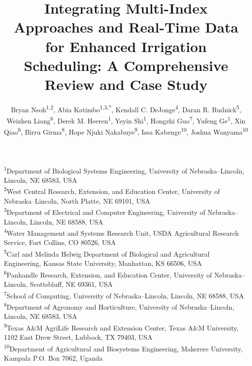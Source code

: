 \documentclass[12pt]{article}
\begin{document}
\title{Integrating Multi-Index Approaches and Real-Time Data for Enhanced Irrigation Scheduling: A Comprehensive Review and Case Study}
\author{%
Bryan Nsoh\textsuperscript{1,2},
Abia Katimbo\textsuperscript{1,3,*},
Kendall C. DeJonge\textsuperscript{4},
Daran R. Rudnick\textsuperscript{5},
Weizhen Liang\textsuperscript{6},
Derek M. Heeren\textsuperscript{1},
Yeyin Shi\textsuperscript{1},
Hongzhi Guo\textsuperscript{7},
Yufeng Ge\textsuperscript{1},
Xin Qiao\textsuperscript{6},
Birru Girma\textsuperscript{8},
Hope Njuki Nakabuye\textsuperscript{9},
Issa Kabenge\textsuperscript{10},
Joshua Wanyama\textsuperscript{10}
}
\date{\vspace{-1em}} %
\maketitle

\noindent
\textsuperscript{1}Department of Biological Systems Engineering, University of Nebraska--Lincoln, Lincoln, NE 68583, USA\\
\textsuperscript{2}West Central Research, Extension, and Education Center, University of Nebraska--Lincoln, North Platte, NE 69101, USA\\
\textsuperscript{3}Department of Electrical and Computer Engineering, University of Nebraska--Lincoln, Lincoln, NE 68588, USA\\
\textsuperscript{4}Water Management and Systems Research Unit, USDA Agricultural Research Service, Fort Collins, CO 80526, USA\\
\textsuperscript{5}Carl and Melinda Helwig Department of Biological and Agricultural Engineering, Kansas State University, Manhattan, KS 66506, USA\\
\textsuperscript{6}Panhandle Research, Extension, and Education Center, University of Nebraska--Lincoln, Scottsbluff, NE 69361, USA\\
\textsuperscript{7}School of Computing, University of Nebraska--Lincoln, Lincoln, NE 68588, USA\\
\textsuperscript{8}Department of Agronomy and Horticulture, University of Nebraska--Lincoln, Lincoln, NE 68583, USA\\
\textsuperscript{9}Texas A\&M AgriLife Research and Extension Center, Texas A\&M University, 1102 East Drew Street, Lubbock, TX 79403, USA\\
\textsuperscript{10}Department of Agricultural and Biosystems Engineering, Makerere University, Kampala P.O. Box 7062, Uganda
\end{document}
